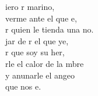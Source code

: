\begin{cancion}%
	iero r marino,\\
	verme ante el que e,\\
	r quien le tienda una no.\\
	jar de r el que ye,\\
	r que soy su her,\\
	rle el calor de la mbre\\
	y anunarle el angeo\\
	 que nos e.\\
\end{cancion}%
